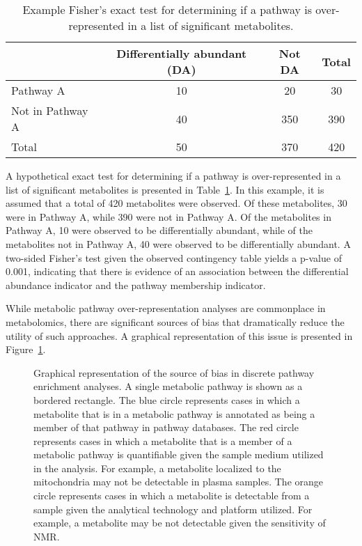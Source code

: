 \begin{DoubleSpace*}
\begin{table}[H]
	\caption[Example Fisher's exact test for determining if a pathway is over-represented in a list of significant metabolites]{\DoubleSpacing Example Fisher's exact test for determining if a pathway is over-represented in a list of significant metabolites. \label{tab:pathExact} }
	\begin{center}
		\begin{tabular}{ l c c c }
			\hline
			& Differentially abundant (DA) & Not DA & Total \\
			\hline
			Pathway A & 10 & 20 & 30 \\
			Not in Pathway A & 40 & 350 &  390 \\
			Total & 50 & 370 & 420\\
			\hline
		\end{tabular}
	\end{center}
\end{table}
A hypothetical exact test for determining if a pathway is over-represented in a list of significant metabolites is presented in Table~\ref{tab:pathExact}. In this example, it is assumed that a total of 420 metabolites were observed. Of these metabolites, 30 were in Pathway A, while 390 were not in Pathway A. Of the metabolites in Pathway A, 10 were observed to be differentially abundant, while of the metabolites not in Pathway A, 40 were observed to be differentially abundant. A two-sided Fisher's test given the observed contingency table yields a p-value of 0.001, indicating that there is evidence of an association between the differential abundance indicator and the pathway membership indicator. 

While metabolic pathway over-representation analyses are commonplace in metabolomics, there are significant sources of bias that dramatically reduce the utility of such approaches. A graphical representation of this issue is presented in Figure~\ref{fig:vennHell}.

\begin{figure}[H]
	\caption[Graphical representation of the source of bias in discrete pathway enrichment analyses]{\DoubleSpacing Graphical representation of the source of bias in discrete pathway enrichment analyses. A single metabolic pathway is shown as a bordered rectangle. The blue circle represents cases in which a metabolite that is in a metabolic pathway is annotated as being a member of that pathway in pathway databases. The red circle represents cases in which a metabolite that is a member of a metabolic pathway is quantifiable given the sample medium utilized in the analysis. For example, a metabolite localized to the mitochondria may not be detectable in plasma samples. The orange circle represents cases in which a metabolite is detectable from a sample given the analytical technology and platform utilized. For example, a metabolite may be not detectable given the sensitivity of NMR. \label{fig:vennHell} }
\end{figure}


\end{DoubleSpace*}
